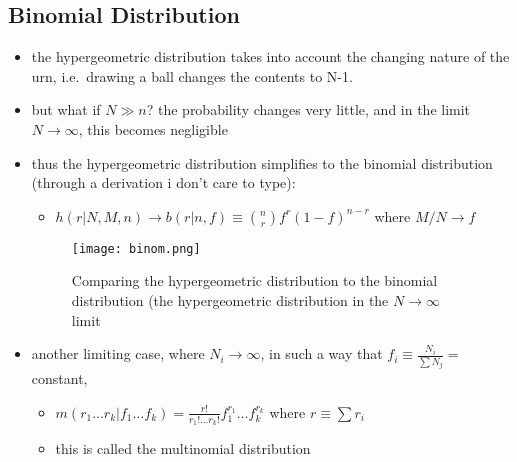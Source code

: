 \documentclass[../jaynes_prob_theory_notes.tex]{subfiles}
\begin{document}
    \subsection{Binomial Distribution}
        \begin{itemize}
            \item the hypergeometric distribution takes into account the changing nature of the urn, i.e.\ drawing a ball changes the contents to N-1. 
            \item but what if $N \gg n$? the probability  changes very little, and in the limit $N \rightarrow \infty$, this becomes negligible
            \item thus the hypergeometric distribution simplifies to the binomial distribution (through a derivation i don't care to type):
                \begin{itemize}
                    \item[] $h(r|N, M, n) \rightarrow b(r|n, f) \equiv \binom{n}{r}f^r(1-f)^{n-r}$ where $M/N \rightarrow f$
                \end{itemize}
        \begin{figure*}[h!]
            \centering
            \texttt{[image: binom.png]}
            \caption{Comparing the hypergeometric distribution to the binomial distribution (the hypergeometric distribution in the $N \rightarrow \infty$ limit}
        \end{figure*}
        
            \item another limiting case, where $N_i \rightarrow \infty$, in such a way that $f_i \equiv \frac{N_i}{\sum N_j} =$ constant,
                \begin{itemize}
                    \item[] $m(r_1\ldots r_k|f_1\ldots f_k) = \frac{r!}{r_1! \ldots r_k!}f_1^{r_1}\ldots f_k^{r_k}$ where $r\equiv \sum r_i$
                    \item this is called the multinomial distribution
                \end{itemize}
        \end{itemize}
\end{document}
